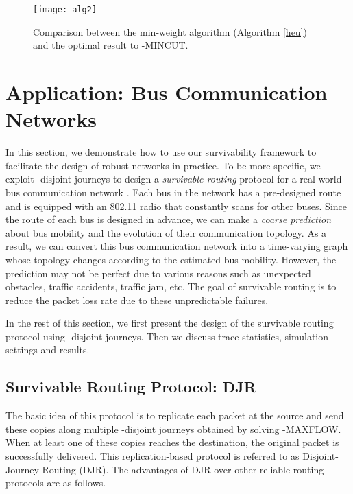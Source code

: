 \documentclass[10pt, conference, letterpaper]{IEEEtran}
\begin{document}
\begin{figure}[ht]
\begin{center}
\texttt{[image: alg2]}
\caption{Comparison between the min-weight algorithm (Algorithm \ref{heu}) and the optimal result to -MINCUT.}
\label{gap_mincut}\vspace{-3mm}
\end{center}
\end{figure}


\section{Application: Bus Communication Networks}\label{app1}
In this section, we demonstrate how to use our survivability framework to facilitate the design of robust networks in practice. To be more specific, we exploit  -disjoint journeys to design a \emph{survivable routing} protocol for a real-world bus communication network \cite{trace}. Each bus in the network has a pre-designed route and is equipped with an 802.11 radio that constantly scans for other buses. Since the route of each bus is designed in advance, we can make a \emph{coarse prediction} about bus mobility and the evolution of their communication topology. As a result, we can convert this bus communication network into a time-varying graph whose topology changes according to the estimated bus mobility. However, the prediction may not be perfect due to various reasons such as unexpected obstacles, traffic accidents, traffic jam, etc.  The goal of survivable routing is to reduce the packet loss rate due to these unpredictable failures.

In the rest of this section, we first present the design of the survivable routing protocol using -disjoint journeys. Then we discuss trace statistics, simulation settings and results.
\subsection{Survivable Routing Protocol: DJR}\label{proto}
The basic idea of this protocol is to replicate each packet at the source and send these copies along multiple -disjoint journeys obtained by solving -MAXFLOW. When at least one of these copies reaches the destination, the original packet is successfully delivered. This replication-based protocol is referred to as Disjoint-Journey Routing (DJR). The advantages of DJR over other reliable routing protocols are as follows.

\vspace{1mm}
\end{document}
